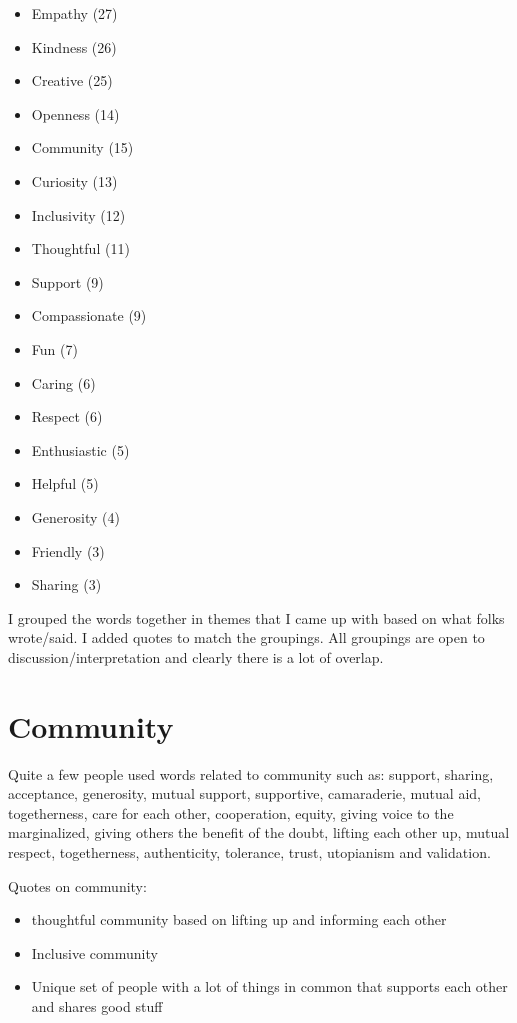 \documentclass[
]{book}
\providecommand{\tightlist}{%
  \setlength{\itemsep}{0pt}\setlength{\parskip}{0pt}}
\begin{document}
\begin{itemize}
\tightlist
\item
  Empathy (27)
\item
  Kindness (26)
\item
  Creative (25)
\item
  Openness (14)
\item
  Community (15)
\item
  Curiosity (13)
\item
  Inclusivity (12)
\item
  Thoughtful (11)
\item
  Support (9)
\item
  Compassionate (9)
\item
  Fun (7)
\item
  Caring (6)
\item
  Respect (6)
\item
  Enthusiastic (5)
\item
  Helpful (5)
\item
  Generosity (4)
\item
  Friendly (3)
\item
  Sharing (3)
\end{itemize}

I grouped the words together in themes that I came up with based on what folks wrote/said. I added quotes to match the groupings. All groupings are open to discussion/interpretation and clearly there is a lot of overlap.

\section{Community}\label{community}

Quite a few people used words related to community such as: support, sharing, acceptance, generosity, mutual support, supportive, camaraderie, mutual aid, togetherness, care for each other, cooperation, equity, giving voice to the marginalized, giving others the benefit of the doubt, lifting each other up, mutual respect, togetherness, authenticity, tolerance, trust, utopianism and validation.

Quotes on community:

\begin{itemize}
\tightlist
\item
  thoughtful community based on lifting up and informing each other
\item
  Inclusive community
\item
  Unique set of people with a lot of things in common that supports each other and shares good stuff
\end{itemize}
\end{document}
